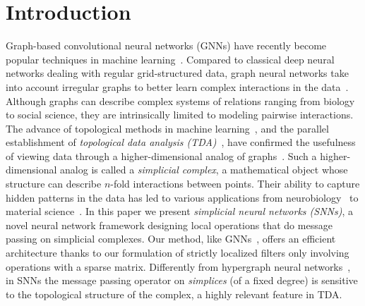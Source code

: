 \section{Introduction}



Graph-based convolutional neural networks (GNNs) have recently become popular techniques in machine learning~\cite{defferrard2016convolutional, bronstein2017geometric, wu2020survey}. Compared to classical deep neural networks dealing with regular grid-structured data, graph neural networks take into account irregular graphs to better learn complex interactions in the data~\cite{battaglia2018relational}. Although graphs can describe complex systems of relations ranging from biology to social science, they are intrinsically limited to modeling pairwise interactions. The advance of topological methods in machine learning~\cite{Gabrielsson2020topological, Hofer2019LearningRO, rieck2018neural}, and the parallel establishment of \emph{topological data analysis (TDA)}~\cite{carlsson2008,chazal2017,edelsbrunner2010computational,ghrist2008barcodes}, have confirmed the usefulness of viewing data through a higher-dimensional analog of graphs~\cite{moore2012,patania2017}. Such a higher-dimensional analog is called a \emph{simplicial complex}, a mathematical object whose structure can  describe $n$-fold interactions between points. Their ability to capture hidden patterns in the data has led to various applications from neurobiology~\cite{giusti2015,reimann2017} to material science~\cite{hiraoka2016}. In this paper we present \textit{simplicial neural networks (SNNs)}, a novel neural network framework designing local operations that do message passing on simplicial complexes.
Our method, like GNNs~\cite{defferrard2016convolutional}, offers an efficient architecture thanks to our formulation of strictly localized filters only involving operations with a sparse matrix. 
Differently from hypergraph neural networks~\cite{feng2018hypergraphs}, in SNNs the message passing operator on \emph{simplices} (of a fixed degree) is sensitive to the topological structure of the complex, a highly relevant feature in TDA.







 













